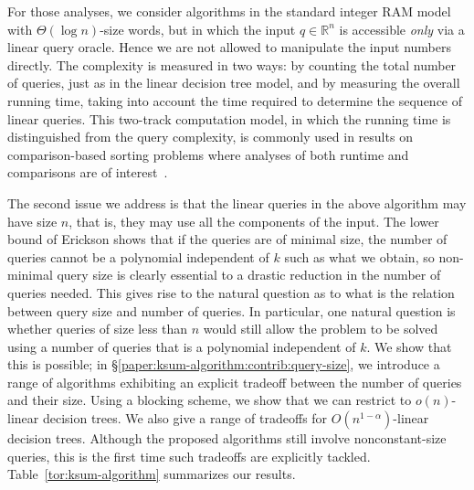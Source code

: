 For those analyses, we consider algorithms in the standard integer RAM model with
$\Theta(\log n)$-size words, but in which the input $q\in\mathbb{R}^n$ is
accessible \emph{only} via a linear query oracle. Hence we are not allowed to
manipulate the input numbers directly. The complexity is measured in two ways:
by counting the total number of queries, just as in the linear decision tree
model, and by measuring the overall running time, taking into account the time
required to determine the sequence of linear queries. This two-track
computation model, in which the running time is distinguished from the query
complexity, is commonly used in results on comparison-based sorting problems
where analyses of both runtime and comparisons are of
interest~\cite{SS95,CFJJM10,CFJJM13}.

The second issue we address is that the linear queries in the above algorithm may
have size $n$, that is, they may use all the components of the input.
The lower bound of Erickson shows that if the queries are of minimal size, the number
of queries cannot be a polynomial independent of $k$ such as what we obtain, so
non-minimal query size is clearly essential to a drastic reduction in the number of queries needed.
This gives rise to the natural question as to what is the relation between query size and number of queries.
In particular, one natural question is whether queries of size less than $n$
would still allow the problem to be solved using a number of queries that is a
polynomial independent of $k$. We show that this is possible; in \S\ref{paper:ksum-algorithm:contrib:query-size},
we introduce a range of
algorithms exhibiting an explicit tradeoff between the number of queries and
their size. Using a blocking scheme, we show that we can restrict to
$o(n)$-linear decision trees. We also give a
range of tradeoffs for $O(n^{1-\alpha})$-linear decision trees. Although the
proposed algorithms still involve nonconstant-size queries, this is
the first time such tradeoffs are explicitly tackled. Table~\ref{tor:ksum-algorithm} summarizes our results.

